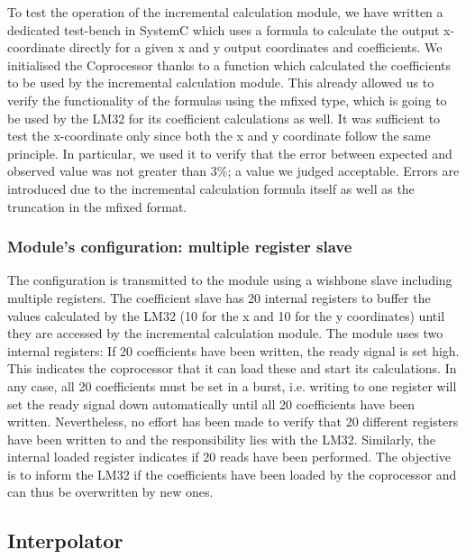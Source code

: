 To test the operation of the incremental calculation module, we have written a dedicated test-bench in SystemC which uses a formula to calculate the output x-coordinate directly for a given x and y output coordinates and coefficients. We initialised the Coprocessor thanks to a function which calculated the coefficients to be used by the incremental calculation module. This already allowed us to verify the functionality of the formulas using the mfixed type, which is going to be used by the LM32 for its coefficient calculations as well. It was sufficient to test the x-coordinate only since both the x and y coordinate follow the same principle. In particular, we used it to verify that the error between expected and observed value was not greater than 3\%; a value we judged acceptable. Errors are introduced due to the incremental calculation formula itself as well as the truncation in the mfixed format.

\subsubsection{Module's configuration: multiple register slave}



The configuration is transmitted to the module using a wishbone slave including multiple registers.
The coefficient slave has 20 internal registers to buffer the values calculated by the LM32 (10 for the x and 10 for the y coordinates) until they are accessed by the incremental calculation module. The module uses two internal registers: If 20 coefficients have been written, the ready signal is set high. This indicates the coprocessor that it can load these and start its calculations. In any case, all 20 coefficients must be set in a burst, i.e. writing to one register will set the ready signal down automatically until all 20 coefficients have been written. Nevertheless, no effort has been made to verify that 20 different registers have been written to and the responsibility lies with the LM32. Similarly, the internal loaded register indicates if 20 reads have been performed. The objective is to inform the LM32 if the coefficients have been loaded by the coprocessor and can thus be overwritten by new ones.

\subsection{Interpolator}

